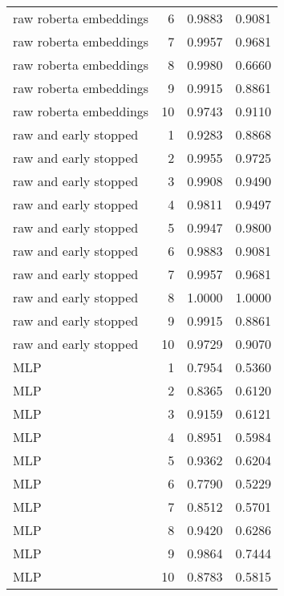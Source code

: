 \begin{table}
\begin{tabular}{lrrr}
raw roberta embeddings & 6 & 0.9883 & 0.9081 \\
raw roberta embeddings & 7 & 0.9957 & 0.9681 \\
raw roberta embeddings & 8 & 0.9980 & 0.6660 \\
raw roberta embeddings & 9 & 0.9915 & 0.8861 \\
raw roberta embeddings & 10 & 0.9743 & 0.9110 \\
raw and early stopped & 1 & 0.9283 & 0.8868 \\
raw and early stopped & 2 & 0.9955 & 0.9725 \\
raw and early stopped & 3 & 0.9908 & 0.9490 \\
raw and early stopped & 4 & 0.9811 & 0.9497 \\
raw and early stopped & 5 & 0.9947 & 0.9800 \\
raw and early stopped & 6 & 0.9883 & 0.9081 \\
raw and early stopped & 7 & 0.9957 & 0.9681 \\
raw and early stopped & 8 & 1.0000 & 1.0000 \\
raw and early stopped & 9 & 0.9915 & 0.8861 \\
raw and early stopped & 10 & 0.9729 & 0.9070 \\
MLP & 1 & 0.7954 & 0.5360 \\
MLP & 2 & 0.8365 & 0.6120 \\
MLP & 3 & 0.9159 & 0.6121 \\
MLP & 4 & 0.8951 & 0.5984 \\
MLP & 5 & 0.9362 & 0.6204 \\
MLP & 6 & 0.7790 & 0.5229 \\
MLP & 7 & 0.8512 & 0.5701 \\
MLP & 8 & 0.9420 & 0.6286 \\
MLP & 9 & 0.9864 & 0.7444 \\
MLP & 10 & 0.8783 & 0.5815 \\
\bottomrule
\end{tabular}
\end{table}
